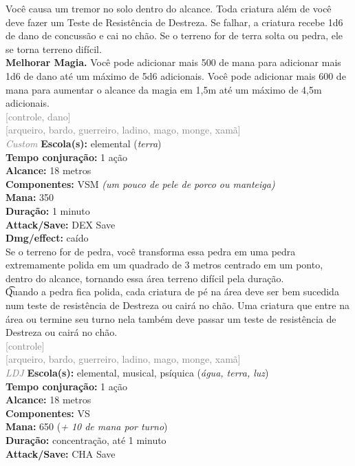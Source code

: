 \documentclass{RPG_Adventure}[2021/10/20]
\begin{document}
{\normalsize Você causa um tremor no solo dentro do alcance. Toda criatura além de você deve fazer um Teste de Resistência de Destreza. Se falhar, a criatura recebe 1d6 de dano de concussão e cai no chão. Se o terreno for de terra solta ou pedra, ele se torna terreno difícil.\\\t \textbf{Melhorar Magia.} Você pode adicionar mais 500 de mana para adicionar mais 1d6 de dano até um máximo de 5d6 adicionais. Você pode adicionar mais 600 de mana para aumentar o alcance da magia em 1,5m até um máximo de 4,5m adicionais.\\}
{\scriptsize \textcolor{gray}{[controle, dano]\\}}
{\scriptsize \textcolor{gray}{[arqueiro, bardo, guerreiro, ladino, mago, monge, xamã]\\}}
{\tiny \textcolor{gray}{\textit{Custom}}}\jump{}
{\small \t \textbf{Escola(s):} elemental (\textit{terra})\\\t \textbf{Tempo conjuração:} 1 ação\\\t \textbf{Alcance:} 18 metros\\\t \textbf{Componentes:} VSM \textit{(um pouco de pele de porco ou manteiga)}\\\t \textbf{Mana:} 350\\\t \textbf{Duração:} 1 minuto\\\t \textbf{Attack/Save:} DEX Save\\\t \textbf{Dmg/effect:} caído\\}
{\normalsize Se o terreno for de pedra, você transforma essa pedra em uma pedra extremamente polida em um quadrado de 3 metros centrado em um ponto, dentro do alcance, tornando essa área terreno difícil pela duração.\\\t Quando a pedra fica polida, cada criatura de pé na área deve ser bem sucedida num teste de resistência de Destreza ou cairá no chão. Uma criatura que entre na área ou termine seu turno nela também deve passar um teste de resistência de Destreza ou cairá no chão.\\}
{\scriptsize \textcolor{gray}{[controle]\\}}
{\scriptsize \textcolor{gray}{[arqueiro, bardo, guerreiro, ladino, mago, monge, xamã]\\}}
{\tiny \textcolor{gray}{\textit{LDJ}}}\jump{}
{\small \t \textbf{Escola(s):} elemental, musical, psíquica (\textit{água, terra, luz})\\\t \textbf{Tempo conjuração:} 1 ação\\\t \textbf{Alcance:} 18 metros\\\t \textbf{Componentes:} VS\\\t \textbf{Mana:} 650 (\textit{+ 10 de mana por turno})\\\t \textbf{Duração:} concentração, até 1 minuto\\\t \textbf{Attack/Save:} CHA Save\\}
\end{document}
